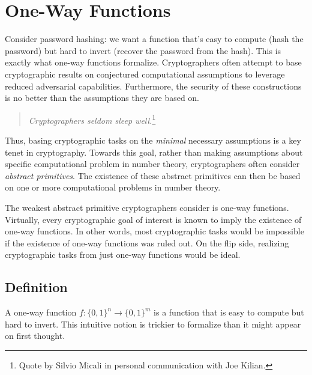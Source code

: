 
\newcommand{\binset}[1]{\{0,1\}^{#1}}
\newcommand{\binfunc}[2]{\binset{#1}\rightarrow\binset{#2}}
\newcommand{\advb}{\mathcal{B}}
\newcommand{\advc}{\mathcal{C}}
\chapter{One-Way Functions}
\label{sec:owf}

\label{ssec:owf}
Consider password hashing: we want a function that's easy to compute (hash the password) but hard to invert (recover the password from the hash). This is exactly what one-way functions formalize. Cryptographers often attempt to base cryptographic results on conjectured computational assumptions to leverage reduced adversarial capabilities. Furthermore, the security of these constructions is no better than the assumptions they are based on. 
\begin{quote}
\emph{Cryptographers seldom sleep well.}\footnote{Quote by Silvio Micali in personal communication with Joe Kilian.}
\end{quote}
Thus, basing cryptographic tasks on the \emph{minimal} necessary assumptions is a key tenet in cryptography. Towards this goal, rather than making assumptions about specific computational problem in number theory, cryptographers often consider \emph{abstract primitives}. The existence of these abstract primitives can then be based on one or more computational problems in number theory.

The weakest abstract primitive cryptographers consider is one-way functions. Virtually, every cryptographic goal of interest is known to imply the existence of one-way functions. In other words, most cryptographic tasks would be impossible if the existence of one-way functions was ruled out. On the flip side, realizing cryptographic tasks from just one-way functions would be ideal. 

\section{Definition}
A one-way function $f: \{0,1\}^n \rightarrow \{0,1\}^m$ is a function that is easy to compute but hard to invert. This intuitive notion is trickier to formalize than it might appear on first thought.

